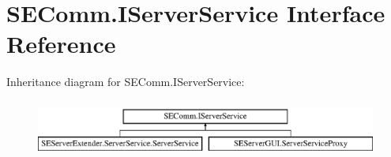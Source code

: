 \hypertarget{interface_s_e_comm_1_1_i_server_service}{}\section{S\+E\+Comm.\+I\+Server\+Service Interface Reference}
\label{interface_s_e_comm_1_1_i_server_service}
Inheritance diagram for S\+E\+Comm.\+I\+Server\+Service\+:\begin{figure}[H]
\begin{center}
\leavevmode
\includegraphics[height=1.872910cm]{interface_s_e_comm_1_1_i_server_service}
\end{center}
\end{figure}
